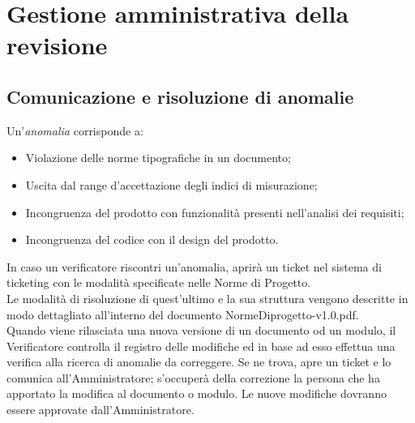 \section{Gestione amministrativa della revisione}


\subsection{Comunicazione e risoluzione di anomalie}

Un'\textit{anomalia} corrisponde a:
\begin{itemize}
	\item Violazione delle norme tipografiche in un documento;
	\item Uscita dal range d'accettazione degli indici di misurazione;
	\item Incongruenza del prodotto con funzionalità presenti nell'analisi dei requisiti;
	\item Incongruenza del codice con il design del prodotto.
\end{itemize}

In caso un verificatore riscontri un'anomalia, aprirà un ticket nel sistema di ticketing con le modalità specificate nelle Norme di Progetto. \\
Le modalità di risoluzione di quest'ultimo e la sua struttura vengono descritte in modo dettagliato all'interno del documento NormeDiprogetto-v1.0.pdf. \\
Quando viene rilasciata una nuova versione di un documento od un modulo, il Verificatore controlla il registro delle modifiche ed in base ad esso effettua una verifica alla ricerca di anomalie da correggere. Se ne trova, apre un ticket e lo comunica all'Amministratore; s'occuperà della correzione la persona che ha apportato la modifica al documento o modulo. Le nuove modifiche dovranno essere approvate dall'Amministratore.